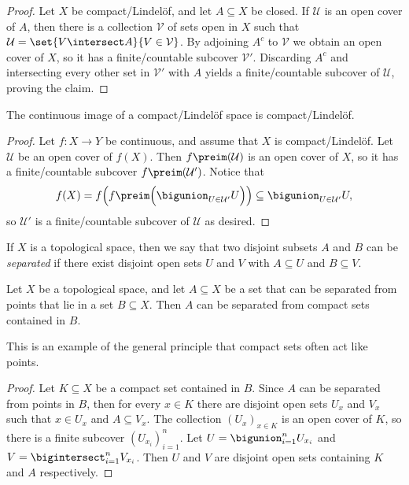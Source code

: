 \documentclass[article, a4paper, 11pt, oneside]{memoir}
\numberwithin{equation}{chapter}
\newcommand{\calU}{\mathcal{U}}
\newcommand{\calV}{\mathcal{V}}
\begin{document}
\begin{proof}
    Let $X$ be compact/Lindelöf, and let $A \subseteq X$ be closed. If $\calU$ is an open cover of $A$, then there is a collection $\calV$ of sets open in $X$ such that $\calU = \set{V \intersect A}{V \in \calV}$. By adjoining $A^c$ to $\calV$ we obtain an open cover of $X$, so it has a finite/countable subcover $\calV'$. Discarding $A^c$ and intersecting every other set in $\calV'$ with $A$ yields a finite/countable subcover of $\calU$, proving the claim.
\end{proof}


\begin{proposition}
    The continuous image of a compact/Lindelöf space is compact/Lindelöf.
\end{proposition}

\begin{proof}
    Let $f \colon X \to Y$ be continuous, and assume that $X$ is compact/Lindelöf. Let $\calU$ be an open cover of $f(X)$. Then $f\preim(\calU)$ is an open cover of $X$, so it has a finite/countable subcover $f\preim(\calU')$. Notice that
    \begin{equation*}
        f(X)
            = f \Bigl( f\preim \Bigl( \bigunion_{U \in \calU'} U \Bigr) \Bigr)
            \subseteq \bigunion_{U \in \calU'} U,
    \end{equation*}
    so $\calU'$ is a finite/countable subcover of $\calU$ as desired.
\end{proof}


If $X$ is a topological space, then we say that two disjoint subsets $A$ and $B$ can be \emph{separated} if there exist disjoint open sets $U$ and $V$ with $A \subseteq U$ and $B \subseteq V$.

\begin{lemma}
    \label{thm:separating_from_compacts}
    Let $X$ be a topological space, and let $A \subseteq X$ be a set that can be separated from points that lie in a set $B \subseteq X$. Then $A$ can be separated from compact sets contained in $B$.
\end{lemma}
%
This is an example of the general principle that compact sets often act like points.

\begin{proof}
    Let $K \subseteq X$ be a compact set contained in $B$. Since $A$ can be separated from points in $B$, then for every $x \in K$ there are disjoint open sets $U_x$ and $V_x$ such that $x \in U_x$ and $A \subseteq V_x$. The collection $(U_x)_{x \in K}$ is an open cover of $K$, so there is a finite subcover $(U_{x_i})_{i=1}^n$. Let $U = \bigunion_{i=1}^n U_{x_i}$ and $V = \bigintersect_{i=1}^n V_{x_i}$. Then $U$ and $V$ are disjoint open sets containing $K$ and $A$ respectively.
\end{proof}
\end{document}
